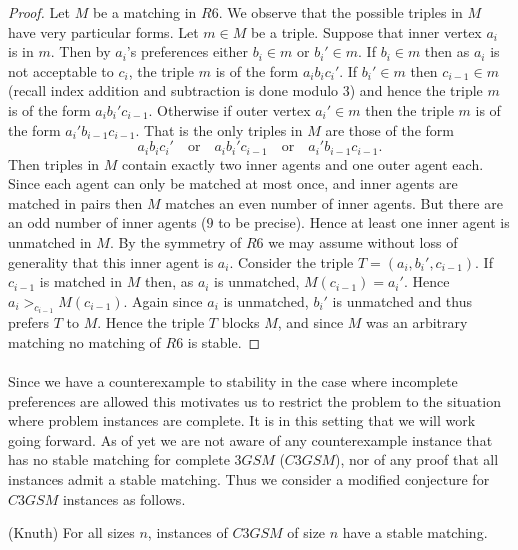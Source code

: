 \begin{proof}
Let $M$ be a matching in $R6$. We observe that the possible triples in $M$ have very particular forms. Let $m \in M$ be a triple. Suppose that inner vertex $a_i$ is in $m$. Then by $a_i$'s preferences either $b_i \in m$ or $b_i' \in m$. If $b_i \in m$ then as $a_i$ is not acceptable to $c_i$, the triple $m$ is of the form $a_ib_ic_i'$. If $b_i' \in m$ then $c_{i-1} \in m$ (recall index addition and subtraction is done modulo $3$) and hence the triple $m$ is of the form $a_i b_i'c_{i-1}$. Otherwise if outer vertex $a_i' \in m$ then the triple $m$ is of the form $a_i'b_{i-1}c_{i-1}$. That is the only triples in $M$ are those of the form
$$a_ib_ic_i' \quad\text{or}\quad a_ib_i'c_{i-1} \quad\text{or}\quad a_i'b_{i-1}c_{i-1}.$$
Then triples in $M$ contain exactly two inner agents and one outer agent each. Since each agent can only be matched at most once, and inner agents are matched in pairs then $M$ matches an even number of inner agents. But there are an odd number of inner agents ($9$ to be precise). Hence at least one inner agent is unmatched in $M$. By the symmetry of $R6$ we may assume without loss of generality that this inner agent is $a_i$. Consider the triple $T=(a_i, b_{i}', c_{i-1})$. If $c_{i-1}$ is matched in $M$ then, as $a_i$ is unmatched, $M(c_{i-1}) = a_i'$. Hence $a_i >_{c_{i-1}} M(c_{i-1})$. Again since $a_i$ is unmatched, $b_{i}'$ is unmatched and thus prefers $T$ to $M$. Hence the triple $T$ blocks $M$, and since $M$ was an arbitrary matching no matching of $R6$ is stable.
\end{proof}
\paragraph{}
Since we have a counterexample to stability in the case where incomplete preferences are allowed this motivates us to restrict the problem to the situation where problem instances are complete. It is in this setting that we will work going forward. As of yet we are not aware of any counterexample instance that has no stable matching for complete $3GSM$ ($C3GSM$), nor of any proof that all instances admit a stable matching. Thus we consider a modified conjecture for $C3GSM$ instances as follows.
\begin{conjecture}\label{conj:stab}
(Knuth) For all sizes $n$, instances of $C3GSM$ of size $n$ have a stable matching.
\end{conjecture} 
